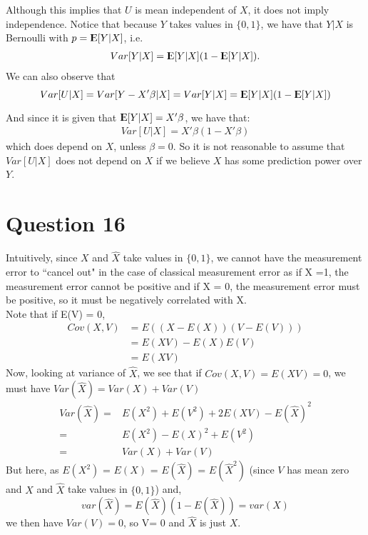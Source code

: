 \documentclass[12pt]{paper}
\newcommand{\Expect}{{\rm I\kern-.3em E}}
\begin{document}
Although this implies that $U$ is mean independent of $X$, it does not imply independence. Notice that because $Y$ takes values in $\{0,1\}$, we have that $Y|X$ is Bernoulli with $p=\Expect[Y|X]$, i.e.
\begin{align*}
Var[Y|X]=\Expect[Y|X](1-\Expect[Y|X]).
\end{align*} 
We can also observe that
\begin{equation}
Var[U|X]=Var[Y-X'\beta|X]=Var[Y|X]=\Expect[Y|X](1-\Expect[Y|X])
\end{equation}

And since it is given that $\Expect[Y|X]=X' \beta$, we have that:
\begin{align*}
Var[U|X]=X' \beta(1-X' \beta)
\end{align*} 
which does depend on $X$, unless $\beta=0$. So it is not reasonable to assume that $Var[U|X]$ does not depend on $X$ if we believe $X$ has some prediction power over $Y$.

\section*{Question 16}

Intuitively, since $X$ and $\hat{X}$ take values in $\{0,1\}$, we cannot have the measurement error to ``cancel out" in the case of classical measurement error as if X =1, the measurement error cannot be positive and if X = 0, the measurement error must be positive, so it must be negatively correlated with X. \\

Note that if E(V) = 0,
\begin{align*}
Cov(X,V) &= E((X-E(X))(V-E(V))) \\
&= E(XV)-E(X)E(V) \\
& = E(XV)
\end{align*}
Now, looking at variance of $\hat X$, we see that if $Cov(X,V) = E(XV) = 0$, we must have $Var(\hat X) = Var(X)+Var(V)$ 
\begin{align*}
Var(\hat X) =& E(X^2) + E(V^2) + 2E(XV) - E(\hat X)^2 \\
=& E(X^2) - E(X)^2 + E(V^2) \\
=& Var(X) + Var(V)
\end{align*}
But here, as $E(X^2)$ = $E(X)$ = $E(\hat{X})$ = $E(\hat{X}^2)$ (since $V$ has mean zero and $X$ and $\hat{X}$ take values in $\{0,1\}$) and, $$var(\hat X) = E(\hat X)(1-E(\hat X)) = var(X)$$ we then have $Var(V) = 0 $, so V= 0 and $\hat X $ is just $X$. 
\end{document}
